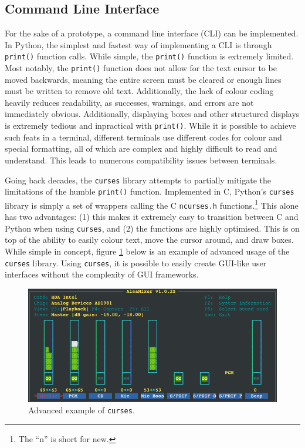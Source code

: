 \documentclass[11pt]{article}
\begin{document}
\subsection{Command Line Interface}

For the sake of a prototype, a command line interface (CLI) can be implemented. In Python, the simplest and fastest way of implementing a CLI is through \texttt{print()} function calls. While simple, the \texttt{print()} function is extremely limited. Most notably, the \texttt{print()} function does not allow for the text cursor to be moved backwards, meaning the entire screen must be cleared or enough lines must be written to remove old text. Additionally, the lack of colour coding heavily reduces readability, as successes, warnings, and errors are not immediately obvious. Additionally, displaying boxes and other structured displays is extremely tedious and inpractical with \texttt{print()}. While it is possible to achieve such feats in a terminal, different terminals use different codes for colour and special formatting, all of which are complex and highly difficult to read and understand. This leads to numerous compatibility issues between terminals.

Going back decades, the \texttt{curses} library attempts to partially mitigate the limitations of the humble \texttt{print()} function. Implemented in C, Python's \texttt{curses} library is simply a set of wrappers calling the C \texttt{ncurses.h} functions.\footnote{The ``n'' is short for new.} This alone has two advantages: (1) this makes it extremely easy to transition between C and Python when using \texttt{curses}, and (2) the functions are highly optimised. This is on top of the ability to easily colour text, move the cursor around, and draw boxes. While simple in concept, figure \ref{fig:ncurses-example} below is an example of advanced usage of the \texttt{curses} library. Using \texttt{curses}, it is possible to easily create GUI-like user interfaces without the complexity of GUI frameworks.

\begin{figure}[b!]
    \centering
    \includegraphics[width=\textwidth]{figures/ncurses_example.png}
    \caption{Advanced example of \texttt{curses}.}
    \label{fig:ncurses-example}
\end{figure}
\end{document}
